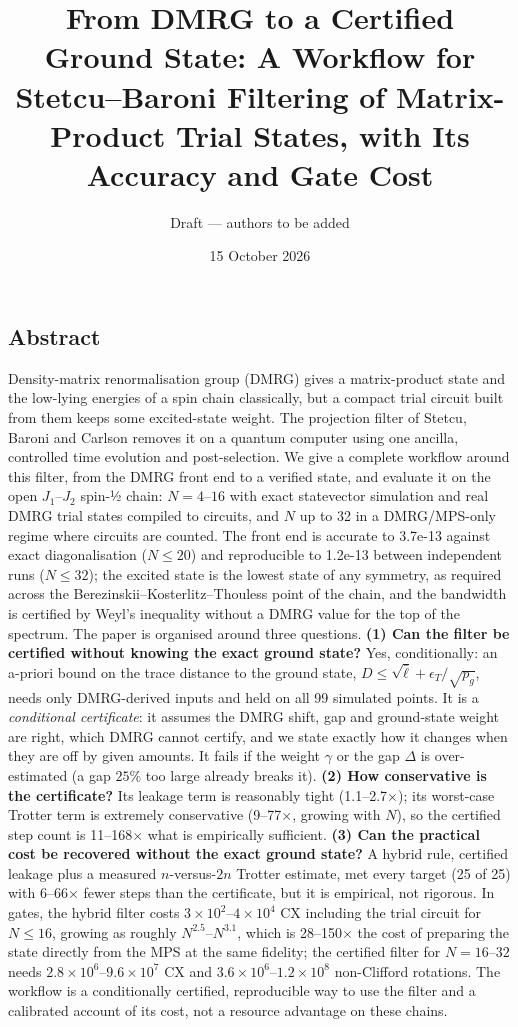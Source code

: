 \documentclass[
]{article}
\title{From DMRG to a Certified Ground State: A Workflow for
Stetcu--Baroni Filtering of Matrix-Product Trial States, with Its
Accuracy and Gate Cost}
\author{Draft --- authors to be added}
\date{15 October 2026}
\begin{document}
\maketitle

\hypertarget{abstract}{%
\subsection{Abstract}\label{abstract}}

Density-matrix renormalisation group (DMRG) gives a matrix-product state
and the low-lying energies of a spin chain classically, but a compact
trial circuit built from them keeps some excited-state weight. The
projection filter of Stetcu, Baroni and Carlson removes it on a quantum
computer using one ancilla, controlled time evolution and
post-selection. We give a complete workflow around this filter, from the
DMRG front end to a verified state, and evaluate it on the open
\(J_1\)--\(J_2\) spin-½ chain: \(N=4\)--\(16\) with exact statevector
simulation and real DMRG trial states compiled to circuits, and \(N\) up
to 32 in a DMRG/MPS-only regime where circuits are counted. The front
end is accurate to 3.7e-13 against exact diagonalisation (\(N\le20\))
and reproducible to 1.2e-13 between independent runs (\(N\le32\)); the
excited state is the lowest state of any symmetry, as required across
the Berezinskii--Kosterlitz--Thouless point of the chain, and the
bandwidth is certified by Weyl's inequality without a DMRG value for the
top of the spectrum. The paper is organised around three questions.
\textbf{(1) Can the filter be certified without knowing the exact ground
state?} Yes, conditionally: an a-priori bound on the trace distance to
the ground state, \(D\le\sqrt{\bar\ell}+\epsilon_T/\sqrt{p_g}\), needs
only DMRG-derived inputs and held on all 99 simulated points. It is a
\emph{conditional certificate}: it assumes the DMRG shift, gap and
ground-state weight are right, which DMRG cannot certify, and we state
exactly how it changes when they are off by given amounts. It fails if
the weight \(\gamma\) or the gap \(\Delta\) is over-estimated (a gap
\(25\%\) too large already breaks it). \textbf{(2) How conservative is
the certificate?} Its leakage term is reasonably tight
(1.1--2.7\(\times\)); its worst-case Trotter term is extremely
conservative (9--77\(\times\), growing with \(N\)), so the certified
step count is 11--168\(\times\) what is empirically sufficient.
\textbf{(3) Can the practical cost be recovered without the exact ground
state?} A hybrid rule, certified leakage plus a measured
\(n\)-versus-\(2n\) Trotter estimate, met every target (25 of 25) with
6--66\(\times\) fewer steps than the certificate, but it is empirical,
not rigorous. In gates, the hybrid filter costs
\(3\times10^{2}\)--\(4\times10^{4}\) CX including the trial circuit for
\(N\le16\), growing as roughly \(N^{2.5}\)--\(N^{3.1}\), which is
28--150\(\times\) the cost of preparing the state directly from the MPS
at the same fidelity; the certified filter for \(N=16\)--\(32\) needs
\(2.8\times10^{6}\)--\(9.6\times10^{7}\) CX and
\(3.6\times10^{6}\)--\(1.2\times10^{8}\) non-Clifford rotations. The
workflow is a conditionally certified, reproducible way to use the
filter and a calibrated account of its cost, not a resource advantage on
these chains.
\end{document}
